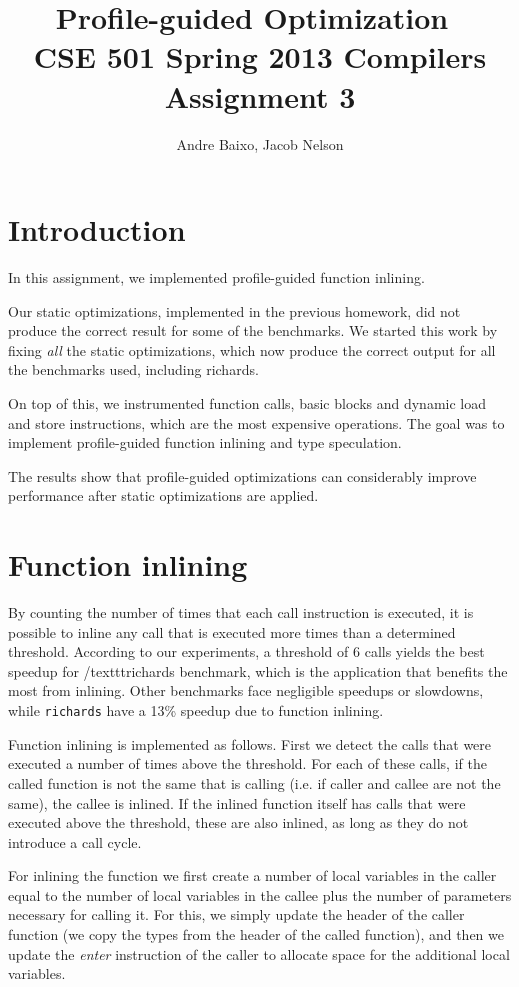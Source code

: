 \documentclass[10pt,twocolumn]{article}
\begin{document}
\title{Profile-guided Optimization\ \\
  \small CSE 501 Spring 2013 Compilers Assignment 3}
\author{Andre Baixo, Jacob Nelson}
\maketitle

\section{Introduction}
In this assignment, we implemented profile-guided function inlining.

Our static optimizations, implemented in the previous homework, did not
produce the correct result for some of the benchmarks. We started this
work by fixing \emph{all} the static optimizations, which now produce
the correct output for all the benchmarks used, including richards.

On top of this, we instrumented function calls, basic blocks and
dynamic load and store instructions, which are the most expensive
operations. The goal was to implement profile-guided function inlining and type speculation.

The results show that profile-guided optimizations can considerably improve performance
after static optimizations are applied.

\section{Function inlining}
By counting the number of times that each call instruction is executed, it is possible to inline any call that is executed more times than a determined threshold. According to our experiments, a threshold of 6 calls yields the best speedup for /texttt{richards} benchmark, which is the application that benefits the most from inlining. Other benchmarks face negligible speedups or slowdowns, while \texttt{richards} have a 13\% speedup due to function inlining.

Function inlining is implemented as follows. First we detect the calls that were executed a number of times above the threshold. For each of these calls, if the called function is not the same that is calling (i.e. if caller and callee are not the same), the callee is inlined. If the inlined function itself has calls that were executed above the threshold, these are also inlined, as long as they do not introduce a call cycle.

For inlining the function we first create a number of local variables in the caller equal to the number of local variables in the callee plus the number of parameters necessary for calling it. For this, we simply update the header of the caller function (we copy the types from the header of the called function), and then we update the \emph{enter} instruction of the caller to allocate space for the additional local variables.
\end{document}
